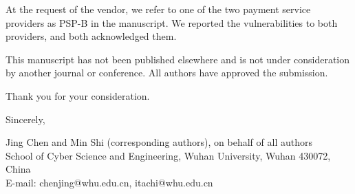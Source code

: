 \documentclass[11pt]{article}
\begin{document}
At the request of the vendor, we refer to one of the two payment service providers as PSP-B in the manuscript.
We reported the vulnerabilities to both providers, and both acknowledged them.

This manuscript has not been published elsewhere and is not under consideration by another journal or conference.
All authors have approved the submission.

Thank you for your consideration.

Sincerely,

Jing Chen and Min Shi (corresponding authors), on behalf of all authors\\
School of Cyber Science and Engineering, Wuhan University, Wuhan 430072, China\\
E-mail: chenjing@whu.edu.cn, itachi@whu.edu.cn
\end{document}
